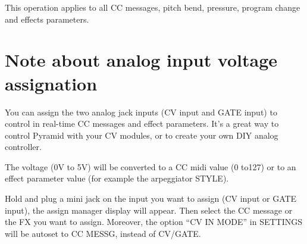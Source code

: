 This operation applies to all CC messages, pitch bend, pressure, program change and effects parameters.


\section{Note about analog input voltage assignation}

You can assign the two analog jack inputs (CV input and GATE input) to control in real-time CC messages and effect parameters. It's a great way to control Pyramid with your CV modules, or to create your own DIY analog controller.

The voltage (0V to 5V) will be converted to a CC midi value (0 to127) or to an effect parameter value (for example the arpeggiator STYLE).

Hold  and plug a mini jack on the input you want to assign (CV input or GATE input), the assign manager display will appear. Then select the CC message or the FX you want to assign. Moreover, the option ``CV IN MODE'' in SETTINGS will be autoset to CC MESSG, instead of CV/GATE.
